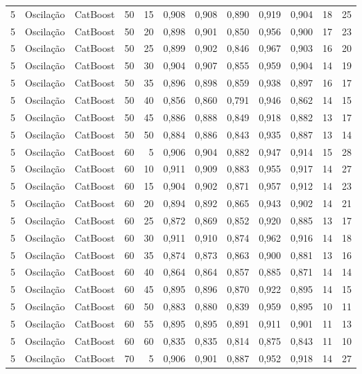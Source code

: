 \begin{longtable}{@{}rllrrrrrrrrr@{}}
5 & Oscilação & CatBoost & 50 & 15 & 0,908 & 0,908 & 0,890 & 0,919 & 0,904 & 18 & 25 \\
5 & Oscilação & CatBoost & 50 & 20 & 0,898 & 0,901 & 0,850 & 0,956 & 0,900 & 17 & 23 \\
5 & Oscilação & CatBoost & 50 & 25 & 0,899 & 0,902 & 0,846 & 0,967 & 0,903 & 16 & 20 \\
5 & Oscilação & CatBoost & 50 & 30 & 0,904 & 0,907 & 0,855 & 0,959 & 0,904 & 14 & 19 \\
5 & Oscilação & CatBoost & 50 & 35 & 0,896 & 0,898 & 0,859 & 0,938 & 0,897 & 16 & 17 \\
5 & Oscilação & CatBoost & 50 & 40 & 0,856 & 0,860 & 0,791 & 0,946 & 0,862 & 14 & 15 \\
5 & Oscilação & CatBoost & 50 & 45 & 0,886 & 0,888 & 0,849 & 0,918 & 0,882 & 13 & 17 \\
5 & Oscilação & CatBoost & 50 & 50 & 0,884 & 0,886 & 0,843 & 0,935 & 0,887 & 13 & 14 \\
5 & Oscilação & CatBoost & 60 & 5 & 0,906 & 0,904 & 0,882 & 0,947 & 0,914 & 15 & 28 \\
5 & Oscilação & CatBoost & 60 & 10 & 0,911 & 0,909 & 0,883 & 0,955 & 0,917 & 14 & 27 \\
5 & Oscilação & CatBoost & 60 & 15 & 0,904 & 0,902 & 0,871 & 0,957 & 0,912 & 14 & 23 \\
5 & Oscilação & CatBoost & 60 & 20 & 0,894 & 0,892 & 0,865 & 0,943 & 0,902 & 14 & 21 \\
5 & Oscilação & CatBoost & 60 & 25 & 0,872 & 0,869 & 0,852 & 0,920 & 0,885 & 13 & 17 \\
5 & Oscilação & CatBoost & 60 & 30 & 0,911 & 0,910 & 0,874 & 0,962 & 0,916 & 14 & 18 \\
5 & Oscilação & CatBoost & 60 & 35 & 0,874 & 0,873 & 0,863 & 0,900 & 0,881 & 13 & 16 \\
5 & Oscilação & CatBoost & 60 & 40 & 0,864 & 0,864 & 0,857 & 0,885 & 0,871 & 14 & 14 \\
5 & Oscilação & CatBoost & 60 & 45 & 0,895 & 0,896 & 0,870 & 0,922 & 0,895 & 14 & 15 \\
5 & Oscilação & CatBoost & 60 & 50 & 0,883 & 0,880 & 0,839 & 0,959 & 0,895 & 10 & 11 \\
5 & Oscilação & CatBoost & 60 & 55 & 0,895 & 0,895 & 0,891 & 0,911 & 0,901 & 11 & 13 \\
5 & Oscilação & CatBoost & 60 & 60 & 0,835 & 0,835 & 0,814 & 0,875 & 0,843 & 11 & 10 \\
5 & Oscilação & CatBoost & 70 & 5 & 0,906 & 0,901 & 0,887 & 0,952 & 0,918 & 14 & 27 \\

\end{longtable}
